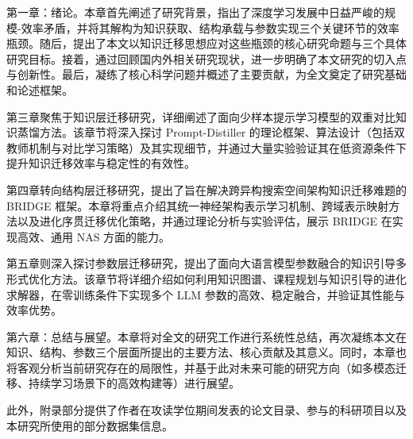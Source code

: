 \documentclass[../main.tex]{subfiles}
\begin{document}
第一章：绪论。本章首先阐述了研究背景，指出了深度学习发展中日益严峻的规模-效率矛盾，并将其解构为知识获取、结构承载与参数实现三个关键环节的效率瓶颈。随后，提出了本文以知识迁移思想应对这些瓶颈的核心研究命题与三个具体研究目标。接着，通过回顾国内外相关研究现状，进一步明确了本文研究的切入点与创新性。最后，凝练了核心科学问题并概述了主要贡献，为全文奠定了研究基础和论述框架。

第三章聚焦于知识层迁移研究，详细阐述了面向少样本提示学习模型的双重对比知识蒸馏方法。该章节将深入探讨 Prompt-Distiller 的理论框架、算法设计（包括双教师机制与对比学习策略）及其实现细节，并通过大量实验验证其在低资源条件下提升知识迁移效率与稳定性的有效性。

第四章转向结构层迁移研究，提出了旨在解决跨异构搜索空间架构知识迁移难题的 BRIDGE 框架。本章将重点介绍其统一神经架构表示学习机制、跨域表示映射方法以及进化序贯迁移优化策略，并通过理论分析与实验评估，展示 BRIDGE 在实现高效、通用 NAS 方面的能力。

第五章则深入探讨参数层迁移研究，提出了面向大语言模型参数融合的知识引导多形式优化方法。该章节将详细介绍如何利用知识图谱、课程规划与知识引导的进化求解器，在零训练条件下实现多个 LLM 参数的高效、稳定融合，并验证其性能与效率优势。

第六章：总结与展望。本章将对全文的研究工作进行系统性总结，再次凝练本文在知识、结构、参数三个层面所提出的主要方法、核心贡献及其意义。同时，本章也将客观分析当前研究存在的局限性，并基于此对未来可能的研究方向（如多模态迁移、持续学习场景下的高效构建等）进行展望。

此外，附录部分提供了作者在攻读学位期间发表的论文目录、参与的科研项目以及本研究所使用的部分数据集信息。
\end{document}
